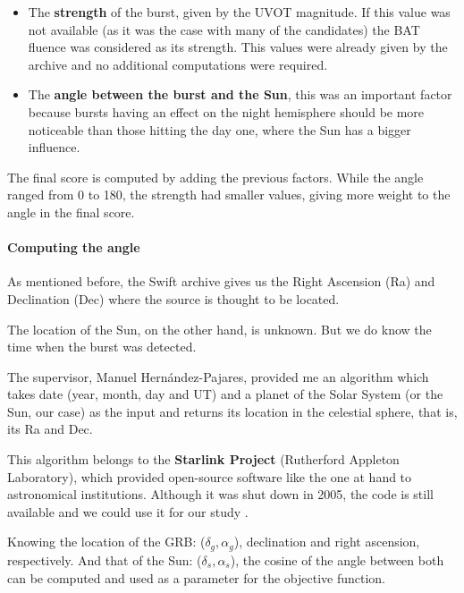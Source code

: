 \begin{itemize}

\item The \textbf{strength} of the burst, given by the UVOT magnitude. If this value was not available (as it was the case with many of the candidates) the BAT fluence was considered as its strength. This values were already given by the archive and no additional computations were required.

\item The \textbf{angle between the burst and the Sun}, this was an important factor because bursts having an effect on the night hemisphere should be more noticeable than those hitting the day one, where the Sun has a bigger influence.

\end{itemize}

The final score is computed by adding the previous factors. While the angle ranged from 0 to 180, the strength had smaller values, giving more weight to the angle in the final score.

\paragraph{Computing the angle}

As mentioned before, the Swift archive gives us the Right Ascension (Ra) and Declination (Dec) where the source is thought to be located.

The location of the Sun, on the other hand, is unknown. But we do know the time when the burst was detected.

The supervisor, Manuel Hernández-Pajares, provided me an algorithm which takes date (year, month, day and UT) and a planet of the Solar System (or the Sun, our case) as the input and returns its location in the celestial sphere, that is, its Ra and Dec. 

This algorithm belongs to the \textbf{Starlink Project} (Rutherford Appleton Laboratory), which provided open-source software like the one at hand to astronomical institutions. Although it was shut down in 2005, the code is still available and we could use it for our study \cite{starlinkproject}.

Knowing the location of the GRB: ($\delta_{g}, \alpha_{g}$), declination and right ascension, respectively. And that of the Sun: ($\delta_{s}, \alpha_{s}$), the cosine of the angle between both can be computed and used as a parameter for the objective function.

